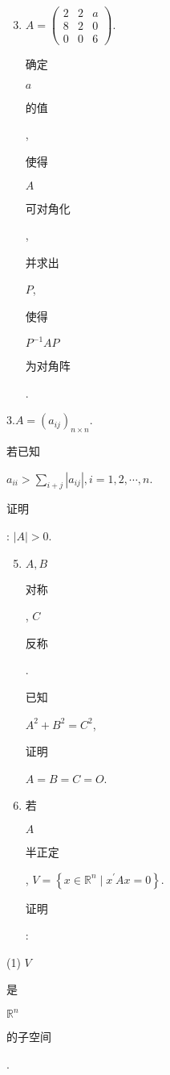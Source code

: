 \documentclass[10pt]{article}
\begin{document}
\begin{enumerate}
  \setcounter{enumi}{2}
  \item $A=\left(\begin{array}{lll}2 & 2 & a \\ 8 & 2 & 0 \\ 0 & 0 & 6\end{array}\right)$. \begin{CJK}{UTF8}{mj}确定\end{CJK} $a$ \begin{CJK}{UTF8}{mj}的值\end{CJK}, \begin{CJK}{UTF8}{mj}使得\end{CJK} $A$ \begin{CJK}{UTF8}{mj}可对角化\end{CJK}, \begin{CJK}{UTF8}{mj}并求出\end{CJK} $P$, \begin{CJK}{UTF8}{mj}使得\end{CJK} $P^{-1} A P$ \begin{CJK}{UTF8}{mj}为对角阵\end{CJK}.
\end{enumerate}
$3 . A=\left(a_{i j}\right)_{n \times n}$. \begin{CJK}{UTF8}{mj}若已知\end{CJK} $a_{i i}>\sum_{i+j}\left|a_{i j}\right|, i=1,2, \cdots, n$. \begin{CJK}{UTF8}{mj}证明\end{CJK}: $|A|>0$.

\begin{enumerate}
  \setcounter{enumi}{4}
  \item $A, B$ \begin{CJK}{UTF8}{mj}对称\end{CJK}, $C$ \begin{CJK}{UTF8}{mj}反称\end{CJK}. \begin{CJK}{UTF8}{mj}已知\end{CJK} $A^{2}+B^{2}=C^{2}$, \begin{CJK}{UTF8}{mj}证明\end{CJK} $A=B=C=O$.

  \item \begin{CJK}{UTF8}{mj}若\end{CJK} $A$ \begin{CJK}{UTF8}{mj}半正定\end{CJK}, $V=\left\{x \in \mathbb{R}^{n} \mid x^{\prime} A x=0\right\}$. \begin{CJK}{UTF8}{mj}证明\end{CJK}:

\end{enumerate}
(1) $V$ \begin{CJK}{UTF8}{mj}是\end{CJK} $\mathbb{R}^{n}$ \begin{CJK}{UTF8}{mj}的子空间\end{CJK}.
\end{document}
